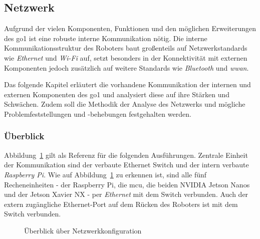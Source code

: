 \subsection{Netzwerk}
\label{subsec:netzwerk}

Aufgrund der vielen Komponenten, Funktionen und den möglichen Erweiterungen des \gls{go1} ist eine robuste interne Kommunikation nötig.
Die interne Kommunikationsstruktur des Roboters baut großenteils auf Netzwerkstandards wie \emph{Ethernet} und \emph{Wi-Fi} auf,
setzt besonders in der Konnektivität mit externen Komponenten jedoch zusätzlich auf weitere Standards wie \emph{Bluetooth} und \emph{\gls{wwan}}.

Das folgende Kapitel erläutert die vorhandene Kommunikation der internen und externen Komponenten des \gls{go1} und analysiert diese
auf ihre Stärken und Schwächen.
Zudem soll die Methodik der Analyse des Netzwerks und mögliche Problemfeststellungen und -behebungen festgehalten werden.

\subsubsection{Überblick}
\label{subsubsec:netzwerk_ueberblick}

Abbildung~\ref{fig:netzwerk_ueberblick} gilt als Referenz für die folgenden Ausführungen.
Zentrale Einheit der Kommunikation sind der verbaute Ethernet Switch und
der intern verbaute \emph{Raspberry Pi}.
Wie auf Abbildung~\ref{fig:netzwerk_ueberblick} zu erkennen ist, sind alle fünf Recheneinheiten -
der Raspberry Pi, die \gls{mcu}, die beiden NVIDIA Jetson Nanos und der Jetson Xavier NX -
per \emph{Ethernet} mit dem Switch verbunden.
Auch der extern zugängliche Ethernet-Port auf dem Rücken des Roboters ist mit dem Switch verbunden.

\begin{figure}[h]
    \caption{Überblick über Netzwerkkonfiguration}\label{fig:netzwerk_ueberblick}
\end{figure}

